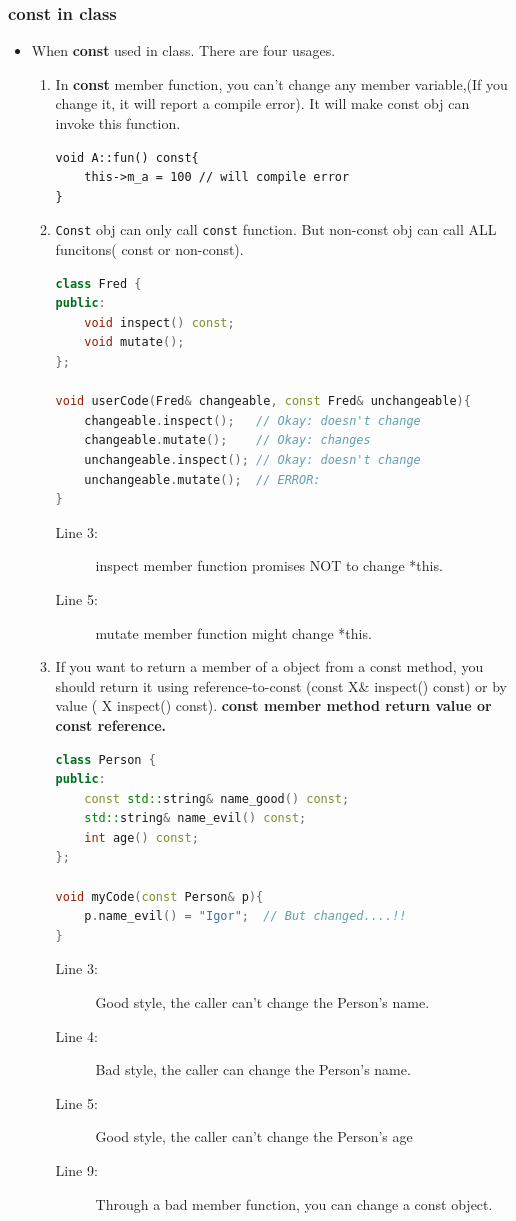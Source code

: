 \documentclass[a4paper,11pt,twoside]{book}
\begin{document}
\subsubsection{const in class}
\begin{itemize}
	
	\item When \textbf{const} used in class. There are four usages.
	\begin{enumerate}
		\item In \textbf{const} member function, you can't change any member variable,(If you change it, it will report a compile error). It will make const obj can invoke this function.
\begin{lstlisting}[numbers=none]
void A::fun() const{
	this->m_a = 100 // will compile error
}
\end{lstlisting}
		
		\item \texttt{Const} obj can only call \texttt{const} function. But non-const obj can call ALL funcitons( const or non-const).
\begin{lstlisting}[frame=single, language=c++, mathescape=true]
class Fred {
public:
	void inspect() const;
	void mutate();
};
		
void userCode(Fred& changeable, const Fred& unchangeable){
	changeable.inspect();   // Okay: doesn't change
	changeable.mutate();    // Okay: changes
	unchangeable.inspect(); // Okay: doesn't change
	unchangeable.mutate();  // ERROR:
}
\end{lstlisting}
\begin{description}
	\item[Line 3:] inspect member function promises NOT to change *this.
	\item[Line 5:] mutate member function might change *this.
\end{description}
		
		\item If you want to return a member of a object from a const method, you should return it using reference-to-const (const X\& inspect() const) or by value ( X inspect() const). \textbf{const member method return value or const reference.}
\begin{lstlisting}[frame=single, language=c++]
class Person {
public:
	const std::string& name_good() const;
	std::string& name_evil() const;
	int age() const;
};
		
void myCode(const Person& p){
	p.name_evil() = "Igor";  // But changed....!!
}
\end{lstlisting}
\begin{description}
	\item[Line 3:]  Good style, the caller can't change the Person's name.
	\item[Line 4:]  Bad style, the caller can change the Person's name.
	\item[Line 5:]  Good style, the caller can't change the Person's age
	\item[Line 9:]  Through a bad member function, you can change a const object. 
\end{description}


\end{enumerate}
\end{itemize}
\end{document}
